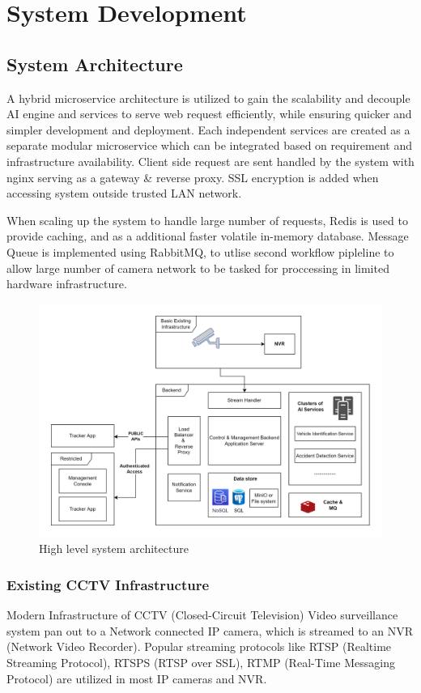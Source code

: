 \chapter{System Development}


\section{System Architecture}

A hybrid microservice architecture is utilized to gain the scalability and decouple AI engine and services to serve web request efficiently, while ensuring quicker and simpler development and deployment. Each independent services are created as a separate modular microservice which can be integrated based on requirement and infrastructure availability.
Client side request are sent handled by the system with nginx serving as a gateway \& reverse proxy. SSL encryption is added when accessing system outside trusted LAN network. 

When scaling up the system to handle large number of requests, Redis is used to provide caching, and as a additional faster volatile in-memory database. Message Queue is implemented using RabbitMQ, to utlise second workflow pipleline to allow large number of camera network to be tasked for proccessing in limited hardware infrastructure.

\begin{figure}
	\centering
	\includegraphics[width=0.8\linewidth]{Images/architecture_high_level}
	\caption{High level system architecture}
	\label{fig:architecturehighlevel}
\end{figure}


\subsection{Existing CCTV Infrastructure}
Modern Infrastructure of CCTV (Closed-Circuit Television) Video surveillance system pan out to a Network connected IP camera, which is streamed to an NVR (Network Video Recorder). Popular streaming protocols like RTSP (Realtime Streaming Protocol), RTSPS (RTSP over SSL), RTMP (Real-Time Messaging Protocol) are utilized in most IP cameras and NVR. 

